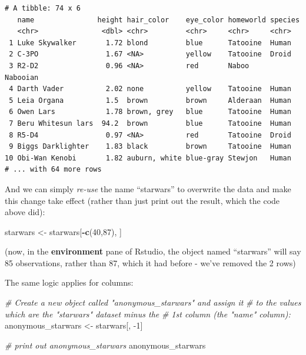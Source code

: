 \documentclass[]{book}
\newenvironment{Shaded}{\begin{snugshade}}{\end{snugshade}}
\newcommand{\CommentTok}[1]{\textcolor[rgb]{0.56,0.35,0.01}{\textit{#1}}}
\newcommand{\DecValTok}[1]{\textcolor[rgb]{0.00,0.00,0.81}{#1}}
\newcommand{\KeywordTok}[1]{\textcolor[rgb]{0.13,0.29,0.53}{\textbf{#1}}}
\newcommand{\NormalTok}[1]{#1}
\newcommand{\OperatorTok}[1]{\textcolor[rgb]{0.81,0.36,0.00}{\textbf{#1}}}
\newcommand{\StringTok}[1]{\textcolor[rgb]{0.31,0.60,0.02}{#1}}
\begin{document}
\begin{verbatim}
# A tibble: 74 x 6
   name               height hair_color    eye_color homeworld species 
   <chr>               <dbl> <chr>         <chr>     <chr>     <chr>   
 1 Luke Skywalker       1.72 blond         blue      Tatooine  Human   
 2 C-3PO                1.67 <NA>          yellow    Tatooine  Droid   
 3 R2-D2                0.96 <NA>          red       Naboo     Nabooian
 4 Darth Vader          2.02 none          yellow    Tatooine  Human   
 5 Leia Organa          1.5  brown         brown     Alderaan  Human   
 6 Owen Lars            1.78 brown, grey   blue      Tatooine  Human   
 7 Beru Whitesun lars  94.2  brown         blue      Tatooine  Human   
 8 R5-D4                0.97 <NA>          red       Tatooine  Droid   
 9 Biggs Darklighter    1.83 black         brown     Tatooine  Human   
10 Obi-Wan Kenobi       1.82 auburn, white blue-gray Stewjon   Human   
# ... with 64 more rows
\end{verbatim}

And we can simply \emph{re-use} the name ``starwars'' to overwrite the data and make this change take effect (rather than just print out the result, which the code above did):

\begin{Shaded}
\begin{Highlighting}[]
\NormalTok{starwars <-}\StringTok{ }\NormalTok{starwars[}\OperatorTok{-}\KeywordTok{c}\NormalTok{(}\DecValTok{40}\NormalTok{,}\DecValTok{87}\NormalTok{), ]}
\end{Highlighting}
\end{Shaded}

(now, in the \textbf{environment} pane of Rstudio, the object named ``starwars'' will say 85 observations, rather than 87, which it had before - we've removed the 2 rows)

The same logic applies for columns:

\begin{Shaded}
\begin{Highlighting}[]
\CommentTok{# Create a new object called "anonymous_starwars" and assign it }
\CommentTok{# to the values which are the "starwars" dataset minus the }
\CommentTok{# 1st column (the "name" column):}
\NormalTok{anonymous_starwars <-}\StringTok{ }\NormalTok{starwars[, }\DecValTok{-1}\NormalTok{]}

\CommentTok{# print out anonymous_starwars}
\NormalTok{anonymous_starwars}
\end{Highlighting}
\end{Shaded}
\end{document}
